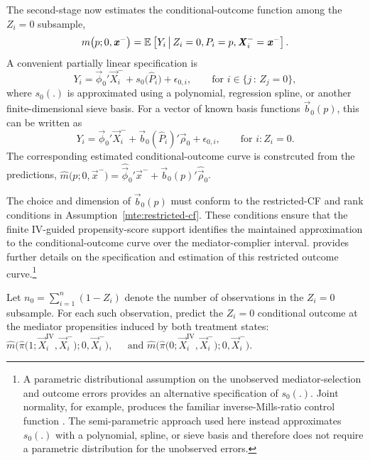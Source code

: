 The second-stage now estimates the conditional-outcome function among the $Z_i=0$ subsample,
\[
    m
    \big(
        p;
        0,
        \boldsymbol{\mathit{x}}^-
    \big)
    =
    \mathbb{E}_{} \left[ 
        Y_i
     \, \middle\vert \, 
        Z_i=0,
        P_i=p,
        \boldsymbol{\mathit{X}}_i^-=\boldsymbol{\mathit{x}}^-
     \right].
\]
A convenient partially linear specification is
\[
    Y_i
    =
    \vec\phi_0'\vec X_i^-
    +
    s_0
    \big(
        \widehat P_i
    \big)
    +
    \epsilon_{0,i},
    \qquad
    \text{for } i \in \{j \,: \, Z_j=0\},
\]
where $s_0(.)$ is approximated using a polynomial, regression spline, or another finite-dimensional sieve basis.
For a vector of known basis functions $\vec b_0(p)$, this can be written as
\[
    Y_i
    =
    \vec\phi_0'\vec X_i^-
    +
    \vec b_0
    \left(
        \widehat P_i
    \right)'
    \vec\rho_0
    +
    \epsilon_{0,i},
    \qquad
    \text{for } i:Z_i=0.
\]
The corresponding estimated conditional-outcome curve is constrcuted from the predictions, 
\(\widehat m
    \big(
        p;
        0,
        \vec x^-
    \big)
    =
    \widehat{\vec\phi}_0'\vec x^-
    +
    \vec b_0(p)'
    \widehat{\vec\rho}_0\).

The choice and dimension of $\vec b_0(p)$ must conform to the restricted-CF and rank conditions in Assumption~\ref{mte:restricted-cf}.
These conditions ensure that the finite IV-guided propensity-score support identifies the maintained approximation to the conditional-outcome curve over the mediator-complier interval.
 provides further details on the specification and estimation of this restricted outcome curve.\footnote{
    A parametric distributional assumption on the unobserved mediator-selection and outcome errors provides an alternative specification of $s_0(.)$.
    Joint normality, for example, produces the familiar inverse-Mills-ratio control function \citep{bjorklund1987estimation,heckman1979sample}.
    The semi-parametric approach used here instead approximates $s_0(.)$ with a polynomial, spline, or sieve basis and therefore does not require a parametric distribution for the unobserved errors.
}

Let
\( n_0 =
    \sum_{i=1}^{n} (1- Z_i) \)
denote the number of observations in the $Z_i=0$ subsample.
For each such observation, predict the $Z_i=0$ conditional outcome at the mediator propensities induced by both treatment states:
$\widehat m
    \Big(
        \widehat\pi
        \big(
            1;
            \vec X_i^{\mathrm{IV}},
            \vec X_i^-
        \big);
        0,
        \vec X_i^-
    \Big),\;\;\;\; \text{ and }
    \widehat m
    \Big(
        \widehat\pi
        \big(
            0;
            \vec X_i^{\mathrm{IV}},
            \vec X_i^-
        \big);
        0,
        \vec X_i^-
    \Big)$.

